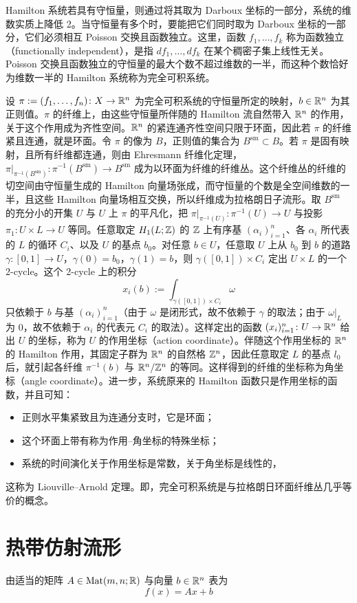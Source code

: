 Hamilton 系统若具有守恒量，则通过将其取为 Darboux 坐标的一部分，系统的维数实质上降低 2。当守恒量有多个时，要能把它们同时取为 Darboux 坐标的一部分，它们必须相互 Poisson 交换且函数独立。这里，函数 $f_1,\dots,f_k$ 称为函数独立（functionally independent），是指 $df_1,\dots,df_k$ 在某个稠密子集上线性无关。Poisson 交换且函数独立的守恒量的最大个数不超过维数的一半，而这种个数恰好为维数一半的 Hamilton 系统称为完全可积系统。

设 $\pi:=(f_1,\dots,f_n)\colon X\to\mathbb{R}^n$ 为完全可积系统的守恒量所定的映射，$b\in\mathbb{R}^n$ 为其正则值。$\pi$ 的纤维上，由这些守恒量所伴随的 Hamilton 流自然带入 $\mathbb{R}^n$ 的作用，关于这个作用成为齐性空间。$\mathbb{R}^n$ 的紧连通齐性空间只限于环面，因此若 $\pi$ 的纤维紧且连通，就是环面。令 $\pi$ 的像为 $B$，正则值的集合为 $B^{\mathrm{sm}}\subset B$。若 $\pi$ 是固有映射，且所有纤维都连通，则由 Ehresmann 纤维化定理，$\pi|_{\pi^{-1}(B^{\mathrm{sm}})}\colon\pi^{-1}(B^{\mathrm{sm}})\to B^{\mathrm{sm}}$ 成为以环面为纤维的纤维丛。这个纤维丛的纤维的切空间由守恒量生成的 Hamilton 向量场张成，而守恒量的个数是全空间维数的一半，且这些 Hamilton 向量场相互交换，所以纤维成为拉格朗日子流形。取 $B^{\mathrm{sm}}$ 的充分小的开集 $U$ 与 $U$ 上 $\pi$ 的平凡化，把 $\pi|_{\pi^{-1}(U)}\colon\pi^{-1}(U)\to U$ 与投影 $\pi_1\colon U\times L\to U$ 等同。任意取定 $H_1(L;\mathbb{Z})$ 的 $\mathbb{Z}$ 上有序基 $(\alpha_i)_{i=1}^{n}$、各 $\alpha_i$ 所代表的 $L$ 的循环 $C_i$、以及 $U$ 的基点 $b_0$。对任意 $b\in U$，任意取 $U$ 上从 $b_0$ 到 $b$ 的道路 $\gamma\colon[0,1]\to U$，$\gamma(0)=b_0$，$\gamma(1)=b$，则 $\gamma([0,1])\times C_i$ 定出 $U\times L$ 的一个 2-cycle。这个 2-cycle 上的积分
\begin{equation}
    x_i(b):=\int_{\gamma([0,1])\times C_i}\omega \tag{8.1}
\end{equation}
只依赖于 $b$ 与基 $(\alpha_i)_{i=1}^{n}$（由于 $\omega$ 是闭形式，故不依赖于 $\gamma$ 的取法；由于 $\omega|_L$ 为 0，故不依赖于 $\alpha_i$ 的代表元 $C_i$ 的取法）。这样定出的函数 $(x_i)_{i=1}^{n}\colon U\to\mathbb{R}^n$ 给出 $U$ 的坐标，称为 $U$ 的作用坐标（action coordinate）。伴随这个作用坐标的 $\mathbb{R}^n$ 的 Hamilton 作用，其固定子群为 $\mathbb{R}^n$ 的自然格 $\mathbb{Z}^n$，因此任意取定 $L$ 的基点 $l_0$ 后，就引起各纤维 $\pi^{-1}(b)$ 与 $\mathbb{R}^n/\mathbb{Z}^n$ 的等同。这样得到的纤维的坐标称为角坐标（angle coordinate）。进一步，系统原来的 Hamilton 函数只是作用坐标的函数，并且可知：

\begin{itemize}[leftmargin=2.4em]
    \item 正则水平集紧致且为连通分支时，它是环面；
    \item 这个环面上带有称为作用–角坐标的特殊坐标；
    \item 系统的时间演化关于作用坐标是常数，关于角坐标是线性的，
\end{itemize}

这称为 Liouville–Arnold 定理。即，完全可积系统是与拉格朗日环面纤维丛几乎等价的概念。


\section{热带仿射流形}

由适当的矩阵 $A\in\operatorname{Mat}(m,n;\mathbb{R})$ 与向量 $b\in\mathbb{R}^n$ 表为
\begin{equation}
    f(x)=Ax+b \tag{9.1}
\end{equation}

